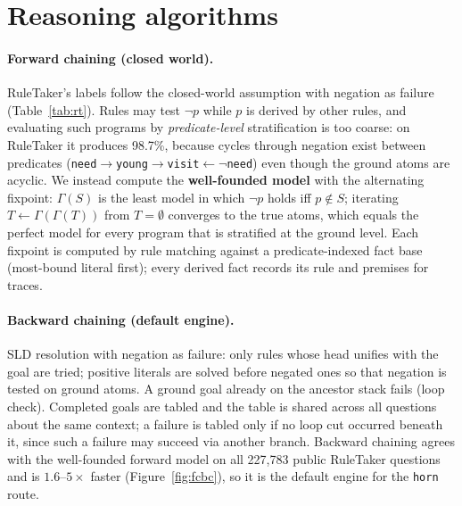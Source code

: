 \documentclass[10pt,a4paper]{article}
\begin{document}
\section{Reasoning algorithms}
\label{sec:algo}
\paragraph{Forward chaining (closed world).} RuleTaker's labels follow the closed-world assumption with negation as failure (Table~\ref{tab:rt}). Rules may test $\neg p$ while $p$ is derived by other rules, and evaluating such programs by \emph{predicate-level} stratification is too coarse: on RuleTaker it produces 98.7\%, because cycles through negation exist between predicates (\texttt{need}$\rightarrow$\texttt{young}$\rightarrow$\texttt{visit}$\leftarrow\neg$\texttt{need}) even though the ground atoms are acyclic. We instead compute the \textbf{well-founded model} with the alternating fixpoint: $\Gamma(S)$ is the least model in which $\neg p$ holds iff $p\notin S$; iterating $T\leftarrow\Gamma(\Gamma(T))$ from $T=\emptyset$ converges to the true atoms, which equals the perfect model for every program that is stratified at the ground level. Each fixpoint is computed by rule matching against a predicate-indexed fact base (most-bound literal first); every derived fact records its rule and premises for traces.

\paragraph{Backward chaining (default engine).} SLD resolution with negation as failure: only rules whose head unifies with the goal are tried; positive literals are solved before negated ones so that negation is tested on ground atoms. A ground goal already on the ancestor stack fails (loop check). Completed goals are tabled and the table is shared across all questions about the same context; a failure is tabled only if no loop cut occurred beneath it, since such a failure may succeed via another branch. Backward chaining agrees with the well-founded forward model on all 227{,}783 public RuleTaker questions and is $1.6$--$5\times$ faster (Figure~\ref{fig:fcbc}), so it is the default engine for the \texttt{horn} route.
\end{document}
